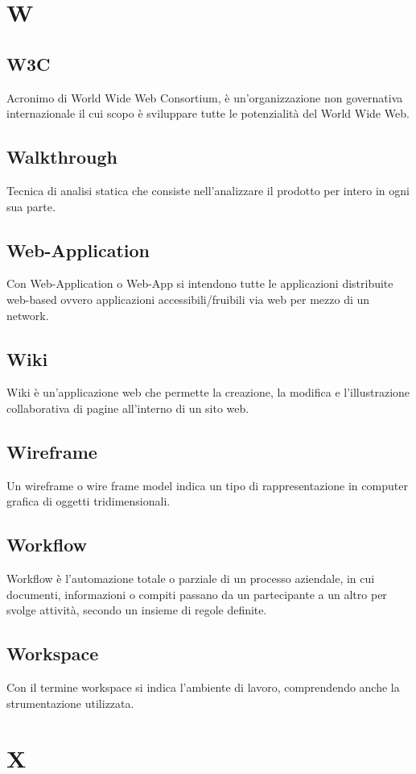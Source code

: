 \newpage \section{W}
\subsection{W3C} Acronimo di World Wide Web Consortium, è un'organizzazione non governativa internazionale il cui scopo è sviluppare tutte le potenzialità del World Wide Web.
\subsection{Walkthrough} Tecnica di analisi statica che consiste nell'analizzare il prodotto per intero in ogni sua parte.
\subsection{Web-Application} Con Web-Application o Web-App si intendono tutte le applicazioni distribuite web-based ovvero applicazioni accessibili/fruibili via web per mezzo di un network. 
\subsection{Wiki}  Wiki è un'applicazione web che permette la creazione, la modifica e l'illustrazione collaborativa di pagine all'interno di un sito web.
\subsection{Wireframe} Un wireframe o wire frame model indica un tipo di rappresentazione in computer grafica di oggetti tridimensionali.
\subsection{Workflow} Workflow è l’automazione totale o parziale di un processo aziendale, in cui documenti, informazioni o compiti passano da un partecipante a un altro per svolge attività, secondo un insieme di regole definite.
\subsection{Workspace} Con il termine workspace si indica l'ambiente di lavoro, comprendendo anche la strumentazione utilizzata.

\newpage \section{X}
